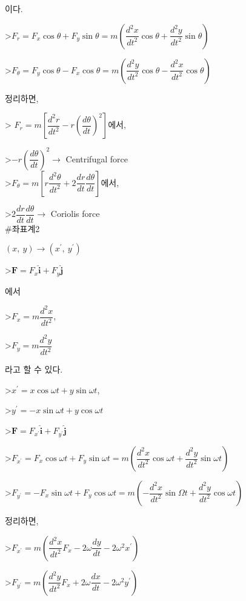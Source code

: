 이다. 

>$ F_{r} = F_{x} \cos \theta + F_{y} \sin \theta 
= m \left ( \dfrac{d^{2}x}{dt^{2}} \cos \theta + \dfrac{d^{2}y}{dt^{2}} \sin \theta \right) $

>$ F_{\theta} = F_{y} \cos \theta - F_{x} \cos \theta 
= m \left ( \dfrac{d^{2}y}{dt^{2}} \cos \theta - \dfrac{d^{2}x}{dt^{2}} \cos \theta \right) $


정리하면, 

> $ F_{r} = m \left[ \dfrac{d^{2}r}{dt^{2}} - r \left( {\dfrac{d \theta}{dt}} \right)^{2} \right] $에서,

>$ -r \left( {\dfrac{d \theta}{dt}} \right)^{2} \rightarrow $ Centrifugal force \\

>$ F_{\theta} = m \left[ r \dfrac{d^{2}\theta}{dt^{2}} + 2 \dfrac{dr}{dt} \dfrac{d\theta}{dt}  \right] $에서, 

>$ 2 \dfrac{dr}{dt} \dfrac{d\theta}{dt} \rightarrow $ Coriolis force \\




#좌표계2

$ (x,~y) 	\rightarrow (x^{\prime},~y^{\prime})$

>$ \mathbf {F} = F_{x} \mathbf{\hat{i}} + F_{y} \mathbf{\hat{j}} $

에서 

>$ F_{x} = m \dfrac{d^{2}x}{dt^{2}}$, 

>$ F_{y} = m \dfrac{d^{2}y}{dt^{2}}$ 

라고 할 수 있다.

>$ x^{\prime} = x \cos \omega t + y \sin \omega t$, 

>$ y^{\prime} = -x \sin \omega t + y \cos \omega t$

>$ \mathbf {F} = F_{x^{\prime}} \mathbf {\hat{i}}  + F_{y^{\prime}} \mathbf {\hat{j}} $

>$ F_{x^{\prime}} = F_{x} \cos \omega t + F_{y} \sin \omega t
= m \left ( \dfrac{d^{2}x}{dt^{2}} \cos \omega t + \dfrac{d^{2}y}{dt^{2}} \sin \omega t \right) $

>$ F_{y^{\prime}} = -F_{x} \sin \omega t + F_{y} \cos \omega t
= m \left ( - \dfrac{d^{2}x}{dt^{2}} \sin \Omega t + \dfrac{d^{2}y}{dt^{2}} \cos \omega t \right) $

정리하면,

>$ F_{x^{\prime}} = m \left( \dfrac{d^{2}x}{dt^{2}}F_{x} - 2 \omega  \dfrac{dy}{dt} - 2 \omega^{2} x^{\prime}  \right) $

>$ F_{y^{\prime}} = m \left( \dfrac{d^{2}y}{dt^{2}}F_{x} + 2 \omega  \dfrac{dx}{dt} - 2 \omega^{2} y^{\prime}  \right) $

